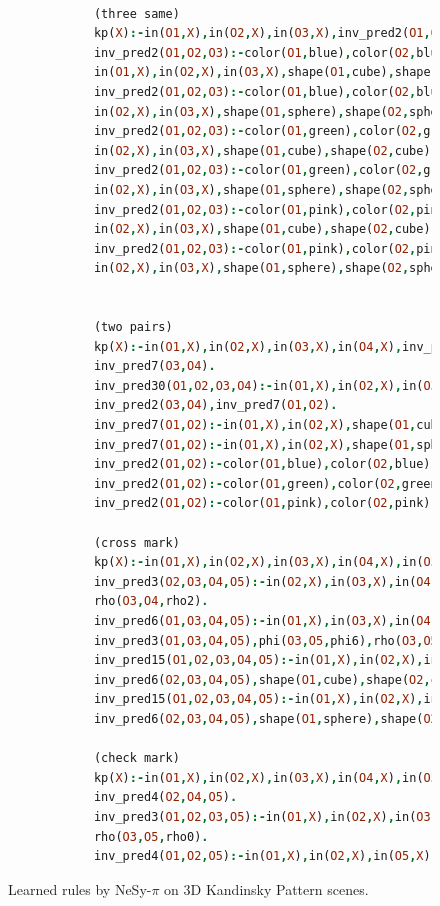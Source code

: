 \documentclass[
]{ceurart}
\begin{document}
	\begin{figure}[t]
		\centering
		\begin{lstlisting}[language=Prolog,  style=Prolog-pygsty]
			
			(three same)
			kp(X):-in(O1,X),in(O2,X),in(O3,X),inv_pred2(O1,O2,O3).
			inv_pred2(O1,O2,O3):-color(O1,blue),color(O2,blue),color(O3,blue),
			in(O1,X),in(O2,X),in(O3,X),shape(O1,cube),shape(O2,cube),shape(O3,cube).
			inv_pred2(O1,O2,O3):-color(O1,blue),color(O2,blue),color(O3,blue),in(O1,X),
			in(O2,X),in(O3,X),shape(O1,sphere),shape(O2,sphere),shape(O3,sphere).
			inv_pred2(O1,O2,O3):-color(O1,green),color(O2,green),color(O3,green),in(O1,X),
			in(O2,X),in(O3,X),shape(O1,cube),shape(O2,cube),shape(O3,cube).
			inv_pred2(O1,O2,O3):-color(O1,green),color(O2,green),color(O3,green),in(O1,X),
			in(O2,X),in(O3,X),shape(O1,sphere),shape(O2,sphere),shape(O3,sphere).
			inv_pred2(O1,O2,O3):-color(O1,pink),color(O2,pink),color(O3,pink),in(O1,X),
			in(O2,X),in(O3,X),shape(O1,cube),shape(O2,cube),shape(O3,cube).
			inv_pred2(O1,O2,O3):-color(O1,pink),color(O2,pink),color(O3,pink),in(O1,X),
			in(O2,X),in(O3,X),shape(O1,sphere),shape(O2,sphere),shape(O3,sphere).
			
			
			(two pairs)
			kp(X):-in(O1,X),in(O2,X),in(O3,X),in(O4,X),inv_pred30(O1,O2,O3,O4),
			inv_pred7(O3,O4).
			inv_pred30(O1,O2,O3,O4):-in(O1,X),in(O2,X),in(O3,X),in(O4,X),inv_pred2(O1,O2),
			inv_pred2(O3,O4),inv_pred7(O1,O2).
			inv_pred7(O1,O2):-in(O1,X),in(O2,X),shape(O1,cube),shape(O2,cube).
			inv_pred7(O1,O2):-in(O1,X),in(O2,X),shape(O1,sphere),shape(O2,sphere).
			inv_pred2(O1,O2):-color(O1,blue),color(O2,blue),in(O1,X),in(O2,X).
			inv_pred2(O1,O2):-color(O1,green),color(O2,green),in(O1,X),in(O2,X).
			inv_pred2(O1,O2):-color(O1,pink),color(O2,pink),in(O1,X),in(O2,X).
			
			(cross mark)
			kp(X):-in(O1,X),in(O2,X),in(O3,X),in(O4,X),in(O5,X),inv_pred15(O1,O2,O3,O4,O5).
			inv_pred3(O2,O3,O4,O5):-in(O2,X),in(O3,X),in(O4,X),in(O5,X),rho(O2,O5,rho2),
			rho(O3,O4,rho2).
			inv_pred6(O1,O3,O4,O5):-in(O1,X),in(O3,X),in(O4,X),in(O5,X),
			inv_pred3(O1,O3,O4,O5),phi(O3,O5,phi6),rho(O3,O5,rho1).
			inv_pred15(O1,O2,O3,O4,O5):-in(O1,X),in(O2,X),in(O3,X),in(O4,X),in(O5,X),
			inv_pred6(O2,O3,O4,O5),shape(O1,cube),shape(O2,cube),shape(O3,cube).
			inv_pred15(O1,O2,O3,O4,O5):-in(O1,X),in(O2,X),in(O3,X),in(O4,X),in(O5,X),
			inv_pred6(O2,O3,O4,O5),shape(O1,sphere),shape(O2,sphere),shape(O3,sphere).
			
			(check mark)
			kp(X):-in(O1,X),in(O2,X),in(O3,X),in(O4,X),in(O5,X),inv_pred3(O1,O2,O3,O5),
			inv_pred4(O2,O4,O5).
			inv_pred3(O1,O2,O3,O5):-in(O1,X),in(O2,X),in(O3,X),in(O5,X),rho(O1,O2,rho0),
			rho(O3,O5,rho0).
			inv_pred4(O1,O2,O5):-in(O1,X),in(O2,X),in(O5,X),rho(O1,O2,rho0),rho(O1,O5,rho0).
		\end{lstlisting}
		\label{fig:3DKP_learned_clauses}
		\caption{Learned rules by NeSy-$\pi$ on 3D Kandinsky Pattern scenes.}
	\end{figure}
	
	
	
	
	
	
	
	
	
	
\end{document}
